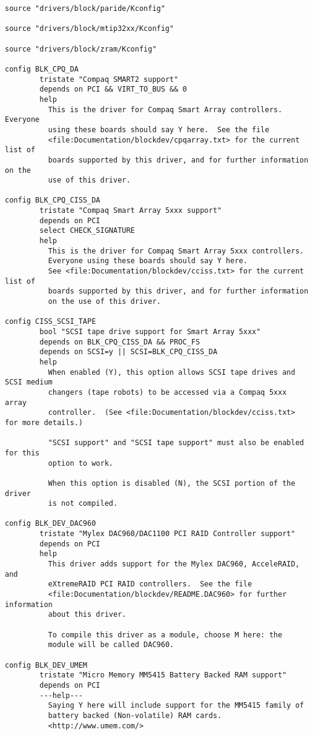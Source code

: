 \documentclass[journal,10pt,onecolumn,compsoc,letterpaper,draftclsnofoot,table,xcdraw]{IEEEtran} \usepackage[margin=0.75in]{geometry}
\begin{document}
\begin{verbatim}
source "drivers/block/paride/Kconfig"

source "drivers/block/mtip32xx/Kconfig"

source "drivers/block/zram/Kconfig"

config BLK_CPQ_DA
        tristate "Compaq SMART2 support"
        depends on PCI && VIRT_TO_BUS && 0
        help
          This is the driver for Compaq Smart Array controllers.  Everyone
          using these boards should say Y here.  See the file
          <file:Documentation/blockdev/cpqarray.txt> for the current list of
          boards supported by this driver, and for further information on the
          use of this driver.

config BLK_CPQ_CISS_DA
        tristate "Compaq Smart Array 5xxx support"
        depends on PCI
        select CHECK_SIGNATURE
        help
          This is the driver for Compaq Smart Array 5xxx controllers.
          Everyone using these boards should say Y here.
          See <file:Documentation/blockdev/cciss.txt> for the current list of
          boards supported by this driver, and for further information
          on the use of this driver.

config CISS_SCSI_TAPE
        bool "SCSI tape drive support for Smart Array 5xxx"
        depends on BLK_CPQ_CISS_DA && PROC_FS
        depends on SCSI=y || SCSI=BLK_CPQ_CISS_DA
        help
          When enabled (Y), this option allows SCSI tape drives and SCSI medium
          changers (tape robots) to be accessed via a Compaq 5xxx array
          controller.  (See <file:Documentation/blockdev/cciss.txt> for more details.)

          "SCSI support" and "SCSI tape support" must also be enabled for this
          option to work.

          When this option is disabled (N), the SCSI portion of the driver
          is not compiled.

config BLK_DEV_DAC960
        tristate "Mylex DAC960/DAC1100 PCI RAID Controller support"
        depends on PCI
        help
          This driver adds support for the Mylex DAC960, AcceleRAID, and
          eXtremeRAID PCI RAID controllers.  See the file
          <file:Documentation/blockdev/README.DAC960> for further information
          about this driver.

          To compile this driver as a module, choose M here: the
          module will be called DAC960.

config BLK_DEV_UMEM
        tristate "Micro Memory MM5415 Battery Backed RAM support"
        depends on PCI
        ---help---
          Saying Y here will include support for the MM5415 family of
          battery backed (Non-volatile) RAM cards.
          <http://www.umem.com/>


\end{verbatim}
\end{document}
